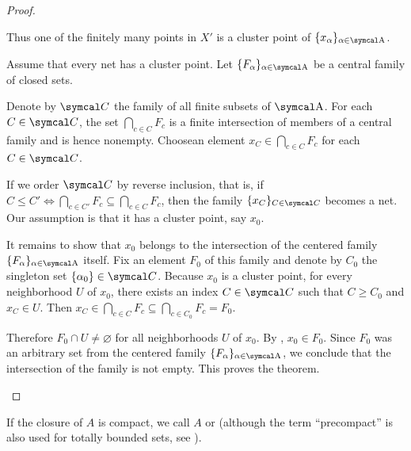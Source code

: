 \begin{proof}
\begin{description}
    Thus one of the finitely many points in \( X' \) is a cluster point of \( \{ x_\al \}_{\al \in \CA} \).

    \cite[theorem 3.1.23]{Engelking1989} Assume that every net has a cluster point. Let \( \{ F_\al \}_{\al \in \CA} \) be a central family of closed sets.

    Denote by \( \Cal C \) the family of all finite subsets of \( \CA \). For each \( C \in \Cal C \), the set \( \bigcap_{c \in C} F_c \) is a finite intersection of members of a central family and is hence nonempty. Choose\AOC an element \( x_C \in \bigcap_{c \in C} F_c \) for each \( C \in \Cal C \).

    If we order \( \Cal C \) by reverse inclusion, that is, if \( C \leq C' \iff \bigcap_{c \in C'} F_c \subseteq \bigcap_{c \in C} F_c \), then the family \( \{ x_C \}_{C \in \Cal C} \) becomes a net. Our assumption is that it has a cluster point, say \( x_0 \).

    It remains to show that \( x_0 \) belongs to the intersection of the centered family \( \{ F_\al \}_{\al \in \CA} \) itself. Fix an element \( F_0 \) of this family and denote by \( C_0 \) the singleton set \( \{ \al_0 \} \in \Cal C \). Because \( x_0 \) is a cluster point, for every neighborhood \( U \) of \( x_0 \), there exists an index \( C \in \Cal C \) such that \( C \geq C_0 \) and \( x_C \in U \). Then \( x_C \in \bigcap_{c \in C} F_c \subseteq \bigcap_{c \in C_0} F_c = F_0 \).

    Therefore \( F_0 \cap U \neq \varnothing \) for all neighborhoods \( U \) of \( x_0 \). By , \( x_0 \in F_0 \). Since \( F_0 \) was an arbitrary set from the centered family \( \{ F_\al \}_{\al \in \CA} \), we conclude that the intersection of the family is not empty. This proves the theorem.
  \end{description}
\end{proof}

\begin{remark}\label{remark:precompact_set}
  If the closure of \( A \) is compact, we call \( A \)  or  (although the term \enquote{precompact} is also used for totally bounded sets, see ).
\end{remark}

